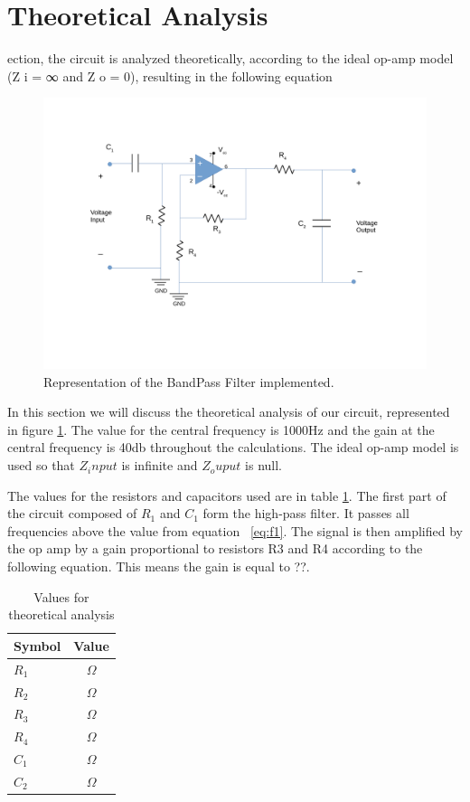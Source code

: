 \newpage
\section{Theoretical Analysis}
\label{sec:analysis}

ection, the circuit is analyzed theoretically, according to the ideal op-amp model (Z i = ∞
and Z o = 0), resulting in the following equation
\begin{figure}[ht!] \centering
\includegraphics[width=0.95\linewidth]{DesenhoT5.pdf}
\caption{Representation of the BandPass Filter implemented.}
\label{fig:DesenhoT5}
\end{figure}

In this section we will discuss the theoretical analysis of our circuit, represented in figure \ref{fig:DesenhoT5}. The value for the central frequency is 1000Hz and the gain at the central frequency is 40db throughout the calculations. The ideal op-amp model is used so that $Z_input$ is infinite and $Z_ouput$ is null.

The values for the resistors and capacitors used are in table \ref{tab:values}. The first part of the circuit composed of $R_1$ and $C_1$ form the high-pass filter. It passes all frequencies above the value from equation ~\ref{eq:f1}. The signal is then amplified by the op amp by a gain proportional to resistors R3 and R4 according to the following equation. This means the gain is equal to ??.
\begin{table}[h]
    \centering
    \begin{tabular}{|l|c|}
    \hline
    {\bf Symbol} & {\bf Value} \\ \hline
    $R_{1}$ & $\Omega$ \\ \hline
    $R_{2}$ & $\Omega$ \\ \hline
    $R_{3}$ & $\Omega$  \\ \hline
    $R_{4}$ & $\Omega$\\ \hline
    $C_{1}$ & $\Omega$\\ \hline
    $C_{2}$ & $\Omega$\\ \hline
    \end{tabular}
    \caption{Values for theoretical analysis}
    \label{tab:values}
\end{table}


